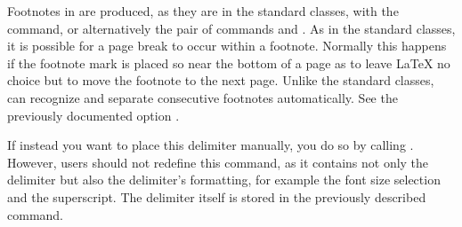 \begin{Declaration}
\end{Declaration}%
Footnotes in \KOMAScript{} are produced, as they are in the standard classes,
with the  command, or alternatively the pair of commands
 and . As in the standard classes,
it is possible for a page break to occur within a footnote. Normally this
happens if the footnote mark is placed so near the bottom of a page as to
leave \LaTeX{} no choice but to move the footnote to the next page.
Unlike
the standard classes, \KOMAScript{} can recognize and separate consecutive
footnotes automatically. 
See the previously
documented option .

If instead you want to place this delimiter manually, you do so by calling
. However, users should not redefine this
command, as it contains not only the delimiter but also the delimiter's
formatting, for example the font size selection and the superscript. The
delimiter itself is stored in the previously described
%
%
 command.

